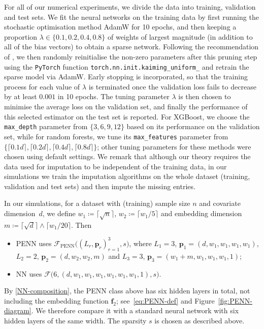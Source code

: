 \documentclass[12pt]{article}
\begin{document}
For all of our numerical experiments, we divide the data into training, validation and test sets.  We fit the neural networks on the training data by first running the stochastic optimisation method AdamW \citep{loshchilov2018decoupled} for 10 epochs, and then keeping a proportion $\lambda \in \{0.1,0.2,0.4,0.8\}$ of weights of largest magnitude (in addition to all of the bias vectors) to obtain a sparse network.  Following the recommendation of \citet{liu2018rethinking}, we then randomly reinitialise the non-zero parameters after this pruning step using the \texttt{PyTorch} function \texttt{torch.nn.init.kaiming\_uniform\_} and retrain the sparse model via AdamW.  Early stopping \citep{prechelt2002early} is incorporated, so that the training process for each value of $\lambda$ is terminated once the validation loss fails to decrease by at least $0{.}001$ in 10 epochs.  The tuning parameter $\lambda$ is then chosen to minimise the average loss on the validation set, and finally the performance of this selected estimator on the test set is reported.  For XGBoost, we choose the \texttt{max\_depth} parameter from $\{3,6,9,12\}$ based on its performance on the validation set, while for random forests, we tune its \texttt{max\_features} parameter from $\{\lceil0.1d\rceil, \lceil0.2d\rceil, \lceil0.4d\rceil, \lceil0.8d\rceil\}$; other tuning parameters for these methods were chosen using default settings.  We remark that although our theory requires the data used for imputation to be independent of the training data, in our simulations we train the imputation algorithms on the whole dataset (training, validation and test sets) and then impute the missing entries.  

In our simulations, for a dataset with (training) sample size $n$ and covariate dimension~$d$, we define $w_1 \coloneqq \lceil \sqrt{n} \rceil$, $w_2 \coloneqq \lceil w_1/5 \rceil$ and embedding dimension $m\coloneqq \lceil \sqrt{d} \rceil \wedge \lceil w_1/20 \rceil$. Then
\begin{itemize}
    \item PENN uses $\mathcal{F}_{\mathrm{PENN}}\bigl((L_r,\bm p_r)_{r=1}^3, s\bigr)$, where $L_1 = 3$, $\bm{p}_1 = (d, w_1, w_1, w_1, w_1)$, $L_2 = 2$, $\bm{p}_2 = (d,w_2,w_2,m)$ and $L_3=3$, $\bm{p}_3=(w_1+m,w_1,w_1,w_1,1)$;
    \item NN uses $\mathcal{F}\bigl(6, (d,w_1,w_1,w_1,w_1,w_1,w_1,1),s\bigr)$.
\end{itemize}
By \ref{NN-composition}, the PENN class above has six hidden layers in total, not including the embedding function $\bm{f}_2$; see~\eqref{eq:PENN-def} and Figure~\ref{fig:PENN-diagram}.  We therefore compare it with a standard neural network with six hidden layers of the same width. The sparsity $s$ is chosen as described above.
\end{document}
